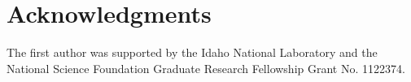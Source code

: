 \section*{Acknowledgments}

The first author was supported by the Idaho National Laboratory and the National Science Foundation Graduate Research Fellowship Grant No. 1122374.